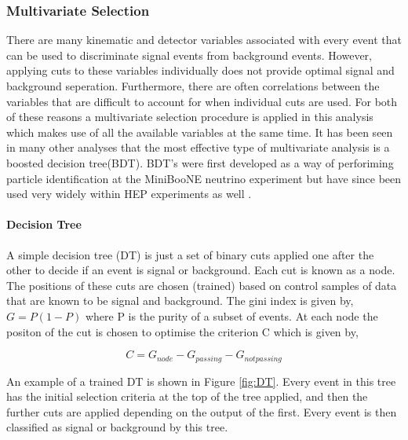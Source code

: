 \subsubsection{Multivariate Selection}
\label{sec:multivar}
There are many kinematic and detector variables associated with every event that can be used to discriminate signal events from background events.  However, applying cuts to these variables individually does not provide optimal signal and background seperation.  Furthermore, there are often correlations between the variables that are difficult to account for when individual cuts are used.  For both of these reasons a multivariate selection procedure is applied in this analysis which makes use of all the available variables at the same time.  It has been seen in many other \lhcb analyses that the most effective type of multivariate analysis is a boosted decision tree(BDT).  BDT's were first developed as a way of perforiming particle identification at the MiniBooNE neutrino experiment but have since been used very widely within HEP experiments as well \cite{2005NIMPA.555..370Y}.

\paragraph{Decision Tree}
A simple decision tree (DT) is just a set of binary cuts applied one after the other to decide if an event is signal or background.  Each cut is known as a node. The positions of these cuts are chosen (trained) based on control samples of data that are known to be signal and background.  The gini index is given by, $G=P(1-P)$ where P is the purity of a subset of events.  At each node the positon of the cut is chosen to optimise the criterion C which is given by,

\begin{equation}
  C=G_{node}-G_{passing}-G_{not passing}
\end{equation}

An example of a trained DT is shown in Figure \ref{fig:DT}.  Every event in this tree has the initial selection criteria at the top of the tree applied, and then the further cuts are applied depending on the output of the first.  Every event is then classified as signal or background by this tree.

